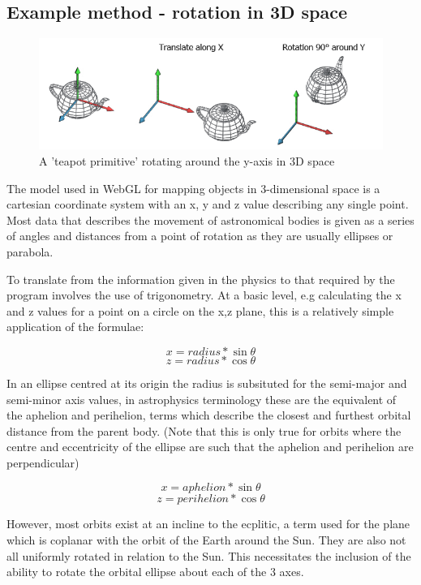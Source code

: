 \documentclass[twoside]{bhamthesis}
\begin{document}
\subsection{Example method - rotation in 3D space}

\begin{figure}[h!]
  \includegraphics[width=\linewidth]{images/teapot.png}
  \caption{A 'teapot primitive' rotating around the y-axis in 3D space {\cite{_coding_????}}}
  \label{fig:teapot}
\end{figure}

The model used in WebGL for mapping objects in 3-dimensional space is a cartesian coordinate system with an x, y and z value describing any single point. Most data that describes the movement of astronomical bodies is given as a series of angles and distances from a point of rotation as they are usually ellipses or parabola.

To translate from the information given in the physics to that required by the program involves the use of trigonometry. At a basic level, e.g calculating the x and z values for a point on a circle on the x,z plane, this is a relatively simple application of the formulae:

\[x = radius*\sin\theta\]
\[z = radius*\cos\theta\]

In an ellipse centred at its origin the radius is subsituted for the semi-major and semi-minor axis values, in astrophysics terminology these are the equivalent of the aphelion and perihelion, terms which describe the closest and furthest orbital distance from the parent body. (Note that this is only true for orbits where the centre and eccentricity of the ellipse are such that the aphelion and perihelion are perpendicular)

\[x = aphelion*\sin\theta\]
\[z = perihelion*\cos\theta\]

However, most orbits exist at an incline to the ecplitic, a term used for the plane which is coplanar with the orbit of the Earth around the Sun. They are also not all uniformly rotated in relation to the Sun. This necessitates the inclusion of the ability to rotate the orbital ellipse about each of the 3 axes.
\end{document}
